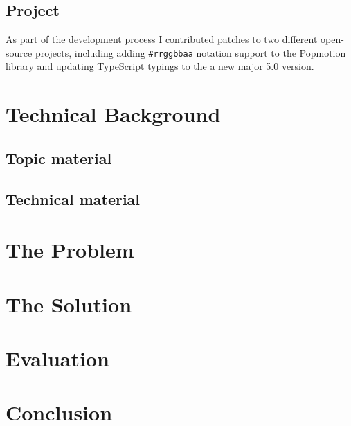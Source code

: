 \documentclass[11pt]{report}
\begin{document}
\section{Project}

As part of the development process I contributed patches to two different
open-source projects, including adding \texttt{{\#}rrggbbaa} notation support
to the Popmotion library\cite{github-pr-popmotion} and updating
 TypeScript typings to the a new major 5.0
version\cite{github-pr-styled-components}.

\chapter{Technical Background}
\section{Topic material}
\section{Technical material}

\chapter{The Problem}
\chapter{The Solution}
\chapter{Evaluation}
\chapter{Conclusion}

\renewcommand*{\bibfont}{\raggedright} %

\end{document}
